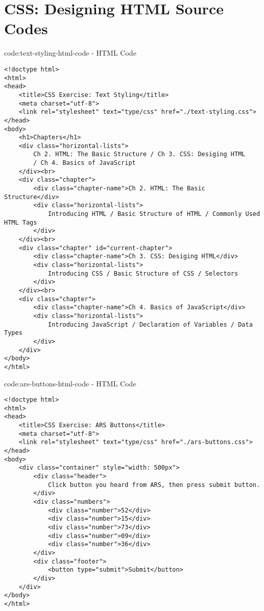 \section{CSS: Designing HTML Source Codes}\label{sect:css-designing-html-codes}

\begin{codeenv}{code:text-styling-html-code}{ - HTML Code}
\begin{verbatim}
<!doctype html>
<html>
<head>
    <title>CSS Exercise: Text Styling</title>
    <meta charset="utf-8">
    <link rel="stylesheet" text="type/css" href="./text-styling.css">
</head>
<body>
    <h1>Chapters</h1>
    <div class="horizontal-lists">
        Ch 2. HTML: The Basic Structure / Ch 3. CSS: Desiging HTML
        / Ch 4. Basics of JavaScript
    </div><br>
    <div class="chapter">
        <div class="chapter-name">Ch 2. HTML: The Basic Structure</div>
        <div class="horizontal-lists">
            Introducing HTML / Basic Structure of HTML / Commonly Used HTML Tags
        </div>
    </div><br>
    <div class="chapter" id="current-chapter">
        <div class="chapter-name">Ch 3. CSS: Desiging HTML</div>
        <div class="horizontal-lists">
            Introducing CSS / Basic Structure of CSS / Selectors
        </div>
    </div><br>
    <div class="chapter">
        <div class="chapter-name">Ch 4. Basics of JavaScript</div>
        <div class="horizontal-lists">
            Introducing JavaScript / Declaration of Variables / Data Types
        </div>
    </div>
</body>
</html>
\end{verbatim}
\end{codeenv}

\begin{codeenv}{code:ars-buttons-html-code}{ - HTML Code}
\begin{verbatim}
<!doctype html>
<html>
<head>
    <title>CSS Exercise: ARS Buttons</title>
    <meta charset="utf-8">
    <link rel="stylesheet" text="type/css" href="./ars-buttons.css">
</head>
<body>
    <div class="container" style="width: 500px">
        <div class="header">
            Click button you heard from ARS, then press submit button.
        </div>
        <div class="numbers">
            <div class="number">52</div>
            <div class="number">15</div>
            <div class="number">73</div>
            <div class="number">09</div>
            <div class="number">36</div>
        </div>
        <div class="footer">
            <button type="submit">Submit</button>
        </div>
    </div>
</body>
</html>
\end{verbatim}
\end{codeenv}

